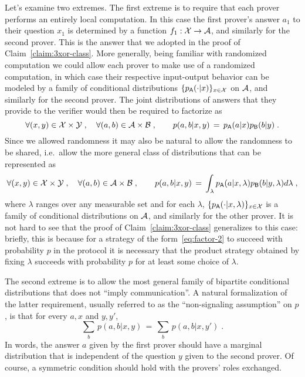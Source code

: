 Let's examine two extremes. The first extreme is to require that each prover performs an entirely local computation. In this case the first prover's answer $a_1$ to their question $x_1$ is determined by a function $f_1:\mathcal{X} \to \mathcal{A}$, and similarly for the second prover. This is the answer that we adopted in the proof of Claim~\ref{claim:3xor-class}. More generally, being familiar with randomized computation we could allow each prover to make use of a randomized computation, in which case their respective input-output behavior can be modeled by a family of conditional distributions $\{p_{\textsf{A}}(\cdot|x)\}_{x\in \mathcal{X}}$ on $\mathcal{A}$, and similarly for the second prover. The joint distributions of answers that they provide to the verifier would then be required to factorize as 
\begin{equation}\label{eq:factor}
\forall (x,y)\in\mathcal{X}\times\mathcal{Y}\;,\quad\forall (a,b)\in\mathcal{A}\times\mathcal{B}\;,\qquad p(a,b|x,y)\,=\,p_{\textsf{A}}(a|x)p_{\textsf{B}}(b|y)\;.
\end{equation}
Since we allowed randomness it may also be natural to allow the randomness to be shared, i.e.\ allow the more general class of distributions that can be represented as 
\begin{equation}\label{eq:factor-2}
\forall (x,y)\in\mathcal{X}\times\mathcal{Y}\;,\quad\forall (a,b)\in\mathcal{A}\times\mathcal{B}\;,\qquad p(a,b|x,y)\,=\,\int_\lambda p_{\textsf{A}}(a|x,\lambda)p_{\textsf{B}}(b|y,\lambda) d\lambda\;,
\end{equation}
where $\lambda$ ranges over any measurable set and for each $\lambda$, $\{p_{{\textsf{A}}}(\cdot|x,\lambda)\}_{x\in\mathcal{X}}$ is a family of conditional distributions on $\mathcal{A}$, and similarly for the other prover. It is not hard to see that the proof of Claim~\ref{claim:3xor-class} generalizes to this case: briefly, this is because for a strategy of the form~\eqref{eq:factor-2} to succeed with probability $p$ in the protocol it is necessary that the product strategy obtained by fixing $\lambda$ succeeds with probability $p$ for at least some choice of $\lambda$.  

The second extreme is to allow the most general family of bipartite conditional distributions that does not ``imply communication''. A natural formalization of the latter requirement, usually referred to as the ``non-signaling assumption'' on $p$, is that for every $a,x$ and $y,y'$, 
\begin{equation}\label{eq:ns-cond}
 \sum_{b}\, p(a,b|x,y)\,=\, \sum_{b}\, p(a,b|x,y')\;.
\end{equation}
In words, the answer $a$ given by the first prover should have a marginal distribution that is independent of the question $y$ given to the second prover. Of course, a symmetric condition should hold with the provers' roles exchanged. 

